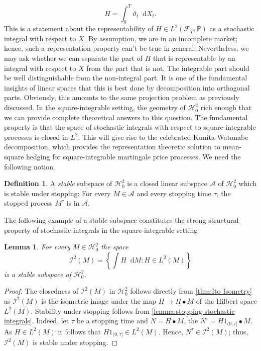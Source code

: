 \documentclass[11pt,a4paper,twoside,openany]{report}
\newcommand{\diff}{\mathop{}\!\mathrm{d}}
\theoremstyle{plain} %
\newtheorem{lemma}[lemma]{Lemma}
\theoremstyle{definition} %
\newtheorem{definition}[definition]{Definition}
\theoremstyle{remark} %
\begin{document}
\begin{equation}
    H=\int_0^T\vartheta_t\diff X_t.
\end{equation}
This is a statement about the representability of \(H\in L^2(\mathcal{F}_T,\mathbb{P})\) as a stochastic integral with respect to \(X\). By assumption, we are in an incomplete market; hence, such a representation property can't be true in general. Nevertheless, we may ask whether we can separate the part of \(H\) that is representable by an integral with respect to \(X\) from the part that is not. The integrable part should be well distinguishable from the non-integral part. It is one of the fundamental insights of linear spaces that this is best done by decomposition into orthogonal parts. Obviously, this amounts to the same projection problem as previously discussed. In the square-integrable setting, the geometry of \(\mathcal{H}_0^2\) rich enough that we can provide complete theoretical answers to this question. The fundamental property is that the space of stochastic integrals with respect to square-integrable processes is closed in \(L^2\). This will give rise to the celebrated Kunita-Watanabe decomposition, which provides the representation theoretic solution to mean-square hedging for square-integrable martingale price processes. We need the following notion.
\begin{definition}\label{def:stable subspace}
    A \textit{stable} subspace of \(\mathcal{H}_0^2\) is a closed linear subspace \(\mathcal{A}\) of \(\mathcal{H}_0^2\) which is stable under stopping: For every \(M\in\mathcal{A}\) and every stopping time \(\tau\), the stopped process \(M^{\tau}\) is in \(\mathcal{A}\).
\end{definition}
The following example of a stable subspace constitutes the strong structural property of stochastic integrals in the square-integrable setting
\begin{lemma}\label{lemma:stochastic integrals as stable subspace}
    For every \(M\in\mathcal{H}_{0}^2\) the space 
    \begin{equation}
        \mathcal{I}^2(M)=\left\{\int H\diff M:H\in L^2(M)\right\}
    \end{equation}
    is a stable subspace of \(\mathcal{H}_0^2\). 
\end{lemma}
\begin{proof}
    The closedness of \( \mathcal{I}^2(M)\) in \(\mathcal{H}^2_0\) follows directly from \cref{thm:Ito Isometry} as \( \mathcal{I}^2(M)\) is the isometric image under the map \(H\to H\bullet M\) of the Hilbert space \(L^2(M)\). Stability under stopping follows from \cref{lemma:stopping stochastic integrals}. Indeed, let \(\tau\) be a stopping time and \(N=H\bullet M\), the \(N^{\tau}=H1_{(0,\tau]}\bullet M\). As \(H\in L^2(M)\) it follows that \(H1_{(0,\tau]}\in L^2(M)\). Hence, \(N^{\tau}\in \mathcal{I}^2(M)\); thus, \(\mathcal{I}^2(M)\) is stable under stopping. 
\end{proof}
\end{document}
